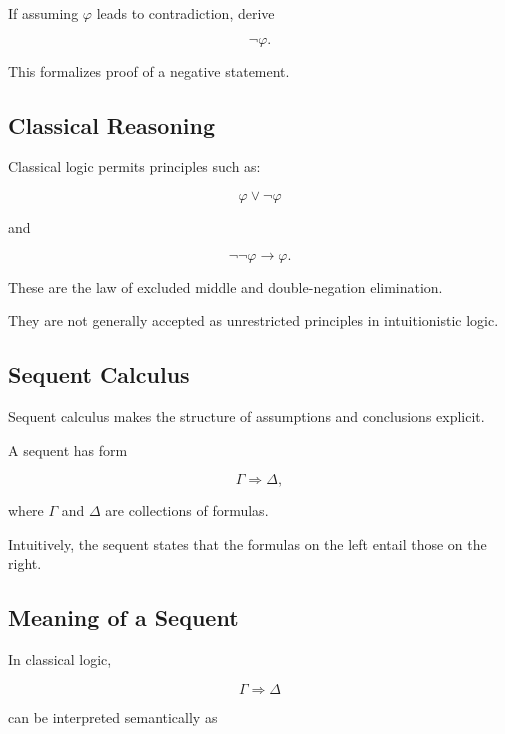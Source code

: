 If assuming \(\varphi\) leads to contradiction, derive

\[
\boxed{
\neg\varphi.
}
\]

This formalizes proof of a negative statement.

\subsection{Classical Reasoning}
\label{subsec:classical-proof-reasoning}

Classical logic permits principles such as:

\[
\boxed{
\varphi\lor\neg\varphi
}
\]

and

\[
\boxed{
\neg\neg\varphi
\rightarrow
\varphi.
}
\]

These are the law of excluded middle and double-negation elimination.

They are not generally accepted as unrestricted principles in
intuitionistic logic.

\subsection{Sequent Calculus}
\label{subsec:sequent-calculus}

Sequent calculus makes the structure of assumptions and conclusions
explicit.

A sequent has form

\[
\boxed{
\Gamma
\Rightarrow
\Delta,
}
\]

where \(\Gamma\) and \(\Delta\) are collections of formulas.

Intuitively, the sequent states that the formulas on the left entail those
on the right.

\subsection{Meaning of a Sequent}
\label{subsec:meaning-of-sequent}

In classical logic,

\[
\Gamma
\Rightarrow
\Delta
\]

can be interpreted semantically as

